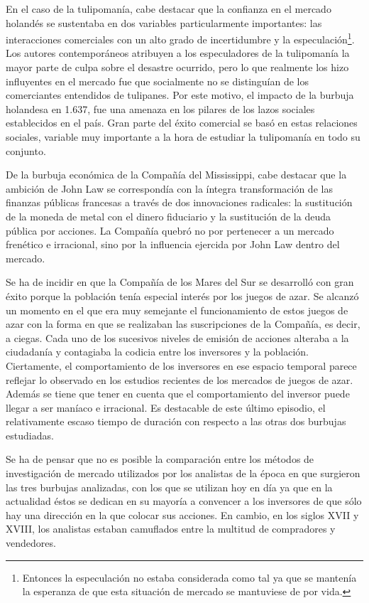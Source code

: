 En el caso de la tulipomanía, cabe destacar que la confianza en el mercado holandés se sustentaba en dos variables particularmente importantes: las interacciones comerciales con un alto grado de incertidumbre y la especulación\footnote{Entonces la especulación no estaba considerada como tal ya que se mantenía la esperanza de que esta situación de mercado se mantuviese de por vida.}. Los autores contemporáneos atribuyen a los especuladores de la tulipomanía la mayor parte de culpa sobre el desastre ocurrido, pero lo que realmente los hizo influyentes en el mercado fue que socialmente no se distinguían de los comerciantes entendidos de tulipanes. Por este motivo, el impacto de la burbuja holandesa en 1.637, fue una amenaza en los pilares de los lazos sociales establecidos en el país. Gran parte del éxito comercial se basó en estas relaciones sociales, variable muy importante a la hora de estudiar la tulipomanía en todo su conjunto.

De la burbuja económica de la Compañía del Mississippi, cabe destacar que la ambición de John Law se correspondía con la íntegra transformación de las finanzas públicas francesas a través de dos innovaciones radicales: la sustitución de la moneda de metal con el dinero fiduciario y la sustitución de la deuda pública por acciones. La Compañía quebró no por pertenecer a un mercado frenético e irracional, sino por la influencia ejercida por John Law dentro del mercado.

Se ha de incidir en que la Compañía de los Mares del Sur se desarrolló con gran éxito porque la población tenía especial interés por los juegos de azar. Se alcanzó un momento en el que era muy semejante el funcionamiento de estos juegos de azar con la forma en que se realizaban las suscripciones de la Compañía, es decir, a ciegas. Cada uno de los sucesivos niveles de emisión de acciones alteraba a la ciudadanía y contagiaba la codicia entre los inversores y la población. Ciertamente, el comportamiento de los inversores en ese espacio temporal parece reflejar lo observado en los estudios recientes de los mercados de juegos de azar. Además se tiene que tener en cuenta que el comportamiento del inversor puede llegar a ser maníaco e irracional. Es destacable de este último episodio, el relativamente escaso tiempo de duración con respecto a las otras dos burbujas estudiadas.

Se ha de pensar que no es posible la comparación entre los métodos de investigación de mercado utilizados por los analistas de la época en que surgieron las tres burbujas analizadas, con los que se utilizan hoy en día ya que en la actualidad éstos se dedican en su mayoría a convencer a los inversores de que sólo hay una dirección en la que colocar sus acciones. En cambio, en los siglos XVII y XVIII, los analistas estaban camuflados entre la multitud de compradores y vendedores.

